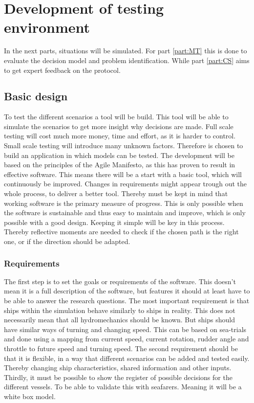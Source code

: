 \chapter{Development of testing environment}
\label{ch:tool}
In the next parts, situations will be simulated. For part \ref{part:MT} this is done to evaluate the decision model and problem identification. While part \ref{part:CS} aims to get expert feedback on the protocol.

\section{Basic design}
To test the different scenarios a tool will be build. This tool will be able to simulate the scenarios to get more insight why decisions are made. Full scale testing will cost much more money, time and effort, as it is harder to control. Small scale testing will introduce many unknown factors. Therefore is chosen to build an application in which models can be tested.
The development will be based on the principles of the Agile Manifesto, as this has proven to result in effective software. This means there will be a start with a basic tool, which will continuously be improved. Changes in requirements might appear trough out the whole process, to deliver a better tool. Thereby must be kept in mind that working software is the primary measure of progress. This is only possible when the software is sustainable and thus easy to maintain and improve, which is only possible with a good design. Keeping it simple will be key in this process. Thereby reflective moments are needed to check if the chosen path is the right one, or if the direction should be adapted.

\subsection{Requirements}
The first step is to set the goals or requirements of the software. This doesn't mean it is a full description of the software, but features it should at least have to be able to answer the research questions.
The most important requirement is that ships within the simulation behave similarly to ships in reality. This does not necessarily mean that all hydromechanics should be known. But ships should have similar ways of turning and changing speed. This can be based on sea-trials and done using a mapping from current speed, current rotation, rudder angle and throttle to future speed and turning speed.
The second requirement should be that it is flexible, in a way that different scenarios can be added and tested easily. Thereby changing ship characteristics, shared information and other inputs.
Thirdly, it must be possible to show the register of possible decisions for the different vessels. To be able to validate this with seafarers. Meaning it will be a white box model.

